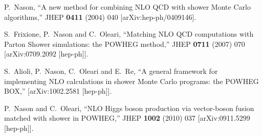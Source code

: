 \documentclass[paper]{JHEP3}
\begin{document}
\begin{thebibliography}{10}

  P.~Nason,
  ``A new method for combining NLO QCD with shower Monte Carlo algorithms,''
  JHEP {\bf 0411} (2004) 040
  [arXiv:hep-ph/0409146].

  S.~Frixione, P.~Nason and C.~Oleari,
``Matching NLO QCD computations with Parton Shower simulations: the POWHEG
method,''
  JHEP {\bf 0711} (2007) 070
  [arXiv:0709.2092 [hep-ph]].

  S.~Alioli, P.~Nason, C.~Oleari and E.~Re,
``A general framework for implementing NLO calculations in shower Monte Carlo
  programs: the POWHEG BOX,''
  [arXiv:1002.2581 [hep-ph]].

  P.~Nason and C.~Oleari,
  ``NLO Higgs boson production via vector-boson fusion matched with shower in
  POWHEG,''
  JHEP {\bf 1002} (2010) 037
  [arXiv:0911.5299 [hep-ph]].



\end{thebibliography}
\end{document}
